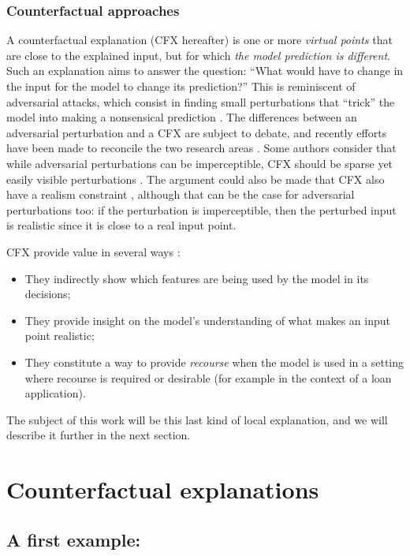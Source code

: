 \documentclass[../main.tex]{subfiles}
\begin{document}
\subsubsection{Counterfactual approaches}\label{par:cfx}

A counterfactual explanation (CFX hereafter) is one or more \emph{virtual points} that are close to the explained input, but for which \emph{the model prediction is different}.
Such an explanation aims to answer the question: ``What would have to change in the input for the model to change its prediction?''
This is reminiscent of adversarial attacks, which consist in finding small perturbations that ``trick'' the model into making a nonsensical prediction \cite{szegedyIntriguing2014,moosavi-dezfooliUniversal2017}.
The differences between an adversarial perturbation and a CFX are subject to debate, and recently efforts have been made to reconcile the two research areas \cite{freieslebenIntriguing2022}.
Some authors consider that while adversarial perturbations can be imperceptible, CFX should be sparse yet easily visible perturbations \cite{laugelLocal2020}.
The argument could also be made that CFX also have a realism constraint \cite{vermaCounterfactual2020}, although that can be the case for adversarial perturbations too: if the perturbation is imperceptible, then the perturbed input is realistic since it is close to a real input point.

CFX provide value in several ways \cite{samekExplainable2019}:
\begin{itemize}
    \item They indirectly show which features are being used by the model in its decisions;
    \item They provide insight on the model's understanding of what makes an input point realistic;
    \item They constitute a way to provide \emph{recourse} when the model is used in a setting where recourse is required or desirable (for example in the context of a loan application).
\end{itemize}

The subject of this work will be this last kind of local explanation, and we will describe it further in the next section.

\section{Counterfactual explanations}

\subsection{A first example: \citeauthor{wachterCounterfactual2017}}
\label{intro/wachter}
\end{document}
